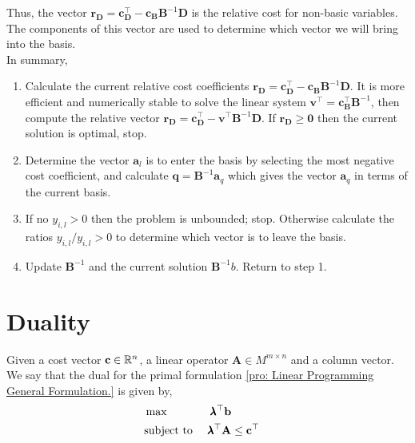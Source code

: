 Thus, the vector $\mathbf{r}_{\mathbf{D}}=\mathbf{c}_{\mathbf{D}}^\top-\mathbf{c}_{\mathbf{B}}\mathbf{B}^{-1}\mathbf{D}$ is the relative cost for non-basic variables. The components of this vector are used to determine which vector we will bring into the basis.\\

In summary,
\begin{enumerate}
	\item Calculate the current relative cost coefficients $\mathbf{r}_{\mathbf{D}}=\mathbf{c}_{\mathbf{D}}^\top-\mathbf{c}_{\mathbf{B}}\mathbf{B}^{-1}\mathbf{D}$. It is more efficient and numerically stable to solve the linear system $\mathbf{v}^\top = \mathbf{c}_{\mathbf{B}}^\top\mathbf{B}^{-1}$, then compute the relative vector
	$ \mathbf{r}_{\mathbf{D}}=\mathbf{c}_{\mathbf{D}}^\top-\mathbf{v}^\top\mathbf{B}^{-1}\mathbf{D}$. If $\mathbf{r}_{\mathbf{D}}\geq \mathbf{0}$ then the current solution is optimal, stop.
	\item Determine the vector $\mathbf{a}_l$ is to enter the basis by selecting the most negative cost coefficient, and calculate $\mathbf{q}=\mathbf{B}^{-1}\mathbf{a}_q$ which gives the vector $\mathbf{a}_q$ in terms of the current basis.
	\item If no $y_{i,l}>0$ then the problem is unbounded; stop. Otherwise calculate the ratios $y_{i,l}/y_{i,l}>0$ to determine which vector is to leave the basis.
	\item Update $\mathbf{B}^{-1}$ and the current solution $\mathbf{B}^{-1}b$. Return to step 1.
\end{enumerate}

\section{Duality}
\begin{problem}
	\label{pro: Linear Programming Dual Formulation.}
	Given a cost vector $\mathbf{c}\in \mathbb{R}^n$, a linear operator $\mathbf{A}\in M^{m\times n}$ and a column vector. We say that the dual for the primal formulation \ref{pro: Linear Programming General Formulation.} is given by,	
	\begin{align}
		&\max & \pmb{\lambda}^\top\mathbf{b} \label{eq: Dual Linear Programming Max}&\\
		&\text{subject to }& \pmb{\lambda}^\top\mathbf{A}&\leq \mathbf{c}^\top & \label{eq: Dual Linear Programming Constraints} 
	\end{align}
\end{problem}

